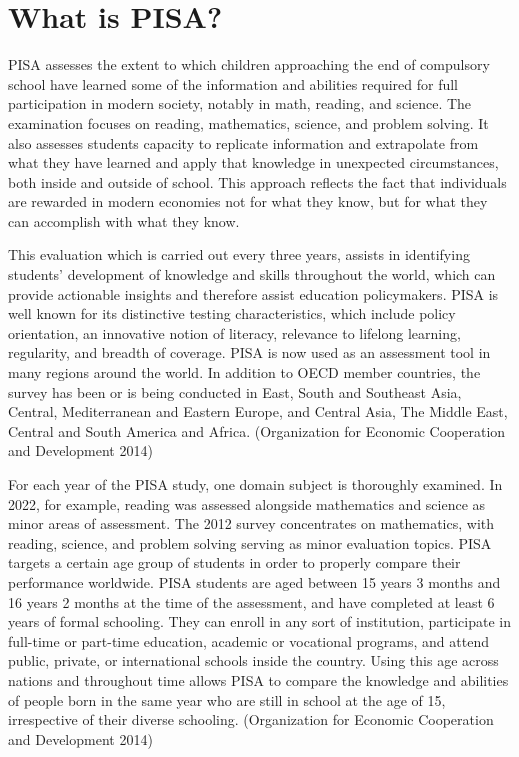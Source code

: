 \hypertarget{what-is-pisa}{%
\section{What is PISA?}\label{what-is-pisa}}

PISA assesses the extent to which children approaching the end of compulsory school have learned some of the information and abilities required for full participation in modern society, notably in math, reading, and science. The examination focuses on reading, mathematics, science, and problem solving. It also assesses students capacity to replicate information and extrapolate from what they have learned and apply that knowledge in unexpected circumstances, both inside and outside of school. This approach reflects the fact that individuals are rewarded in modern economies not for what they know, but for what they can accomplish with what they know.

This evaluation which is carried out every three years, assists in identifying students' development of knowledge and skills throughout the world, which can provide actionable insights and therefore assist education policymakers. PISA is well known for its distinctive testing characteristics, which include policy orientation, an innovative notion of literacy, relevance to lifelong learning, regularity, and breadth of coverage. PISA is now used as an assessment tool in many regions around the world. In addition to OECD member countries, the survey has been or is being conducted in East, South and Southeast Asia, Central, Mediterranean and Eastern Europe, and Central Asia, The Middle East, Central and South America and Africa. (Organization for Economic Cooperation and Development 2014)

For each year of the PISA study, one domain subject is thoroughly examined. In 2022, for example, reading was assessed alongside mathematics and science as minor areas of assessment. The 2012 survey concentrates on mathematics, with reading, science, and problem solving serving as minor evaluation topics. PISA targets a certain age group of students in order to properly compare their performance worldwide. PISA students are aged between 15 years 3 months and 16 years 2 months at the time of the assessment, and have completed at least 6 years of formal schooling. They can enroll in any sort of institution, participate in full-time or part-time education, academic or vocational programs, and attend public, private, or international schools inside the country. Using this age across nations and throughout time allows PISA to compare the knowledge and abilities of people born in the same year who are still in school at the age of 15, irrespective of their diverse schooling. (Organization for Economic Cooperation and Development 2014)

